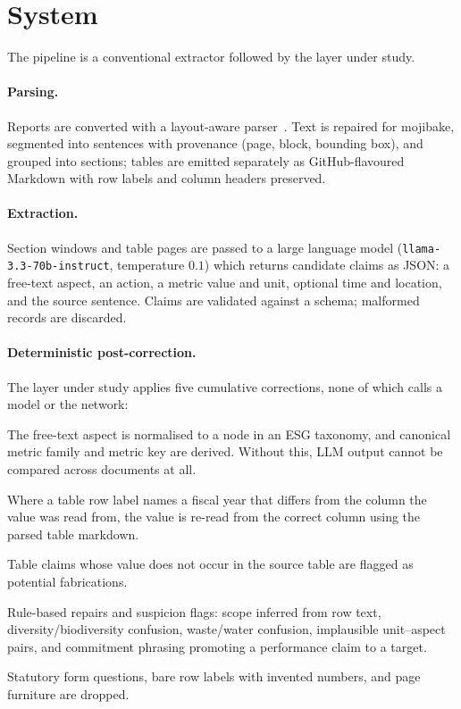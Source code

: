 \documentclass[3p,times]{elsarticle}
\begin{document}
\section{System}

The pipeline is a conventional extractor followed by the layer under study.

\paragraph{Parsing.} Reports are converted with a layout-aware
parser~\cite{auer2024docling}. Text is repaired for mojibake, segmented into
sentences with provenance (page, block, bounding box), and grouped into sections;
tables are emitted separately as GitHub-flavoured Markdown with row labels and
column headers preserved.

\paragraph{Extraction.} Section windows and table pages are passed to a
large language model (\texttt{llama-3.3-70b-instruct}, temperature $0.1$) which
returns candidate claims as JSON: a free-text aspect, an action, a metric value
and unit, optional time and location, and the source sentence. Claims are
validated against a schema; malformed records are discarded.

\paragraph{Deterministic post-correction.} The layer under study applies five
cumulative corrections, none of which calls a model or the network:

\begin{description}\itemsep2pt
\item[S1 Ontology.] The free-text aspect is normalised to a node in an ESG
  taxonomy, and canonical metric family and metric key are derived. Without
  this, LLM output cannot be compared across documents at all.
\item[S2 Fiscal-year repair.] Where a table row label names a fiscal year that
  differs from the column the value was read from, the value is re-read from the
  correct column using the parsed table markdown.
\item[S3 Source-value verification.] Table claims whose value does not occur in
  the source table are flagged as potential fabrications.
\item[S4 Gate corrections.] Rule-based repairs and suspicion flags: scope
  inferred from row text, diversity/biodiversity confusion, waste/water
  confusion, implausible unit--aspect pairs, and commitment phrasing promoting a
  performance claim to a target.
\item[S5 Furniture filter.] Statutory form questions, bare row labels with
  invented numbers, and page furniture are dropped.
\end{description}
\end{document}
